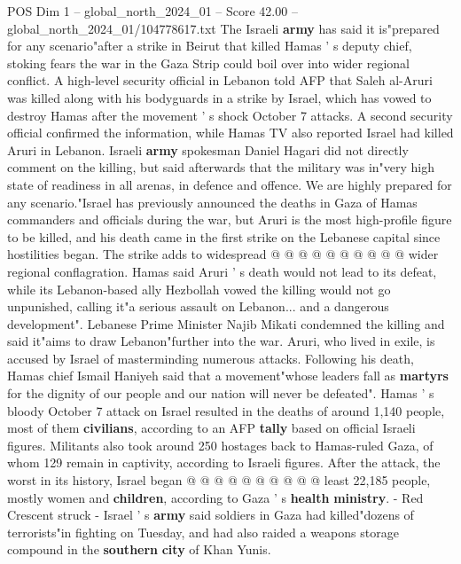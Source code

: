 \begin{textsample}{POS Dim 1 – global\_north\_2024\_01 – Score 42.00 – global\_north\_2024\_01/104778617.txt}  \label{ex:f1_pos_158}
The Israeli \textbf{army} has said it is"prepared for any scenario"after a strike in Beirut that killed Hamas ' s deputy chief, stoking fears the war in the Gaza Strip could boil over into wider regional conflict.
A high-level security official in Lebanon told AFP that Saleh al-Aruri was killed along with his bodyguards in a strike by Israel, which has vowed to destroy Hamas after the movement ' s shock October 7 attacks.
A second security official confirmed the information, while Hamas TV also reported Israel had killed Aruri in Lebanon.
Israeli \textbf{army} spokesman Daniel Hagari did not directly comment on the killing, but said afterwards that the military was in"very high state of readiness in all arenas, in defence and offence.
We are highly prepared for any scenario."Israel has previously announced the deaths in Gaza of Hamas commanders and officials during the war, but Aruri is the most high-profile figure to be killed, and his death came in the first strike on the Lebanese capital since hostilities began.
The strike adds to widespread @ @ @ @ @ @ @ @ @ @ wider regional conflagration.
Hamas said Aruri ' s death would not lead to its defeat, while its Lebanon-based ally Hezbollah vowed the killing would not go unpunished, calling it"a serious assault on Lebanon... and a dangerous development".
Lebanese Prime Minister Najib Mikati condemned the killing and said it"aims to draw Lebanon"further into the war.
Aruri, who lived in exile, is accused by Israel of masterminding numerous attacks.
Following his death, Hamas chief Ismail Haniyeh said that a movement"whose leaders fall as \textbf{martyrs} for the dignity of our people and our nation will never be defeated".
Hamas ' s bloody October 7 attack on Israel resulted in the deaths of around 1,140 people, most of them \textbf{civilians}, according to an AFP \textbf{tally} based on official Israeli figures.
Militants also took around 250 hostages back to Hamas-ruled Gaza, of whom 129 remain in captivity, according to Israeli figures.
After the attack, the worst in its history, Israel began @ @ @ @ @ @ @ @ @ @ least 22,185 people, mostly women and \textbf{children}, according to Gaza ' s \textbf{health} \textbf{ministry}. - Red Crescent struck - Israel ' s \textbf{army} said soldiers in Gaza had killed"dozens of terrorists"in fighting on Tuesday, and had also raided a weapons storage compound in the \textbf{southern} \textbf{city} of Khan Yunis.

\end{textsample}
